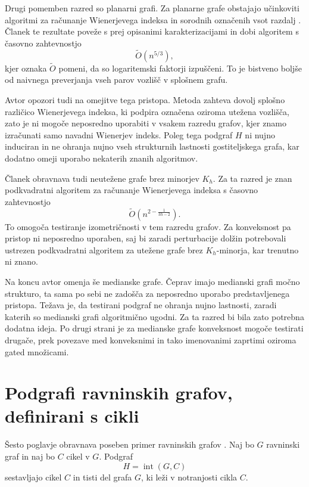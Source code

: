 \documentclass[sigconf
]{acmart}
\theoremstyle{definition}
\begin{document}
Drugi pomemben razred so planarni grafi. Za planarne grafe obstajajo učinkoviti algoritmi za računanje Wienerjevega indeksa in sorodnih označenih vsot razdalj \cite{voronoi, subquadratic}. Članek te rezultate poveže s prej opisanimi karakterizacijami in dobi algoritem s časovno zahtevnostjo
\begin{equation}
    \tilde{O}(n^{5/3}),
\end{equation}
kjer oznaka $\tilde{O}$ pomeni, da so logaritemski faktorji izpuščeni. To je bistveno boljše od naivnega preverjanja vseh parov vozlišč v splošnem grafu.

Avtor opozori tudi na omejitve tega pristopa. Metoda zahteva dovolj splošno različico Wienerjevega indeksa, ki podpira označena oziroma utežena vozlišča, zato je ni mogoče neposredno uporabiti v vsakem razredu grafov, kjer znamo izračunati samo navadni Wienerjev indeks. Poleg tega podgraf $H$ ni nujno induciran in ne ohranja nujno vseh strukturnih lastnosti gostiteljskega grafa, kar dodatno omeji uporabo nekaterih znanih algoritmov.

Članek obravnava tudi neutežene grafe brez minorjev $K_h$. Za ta razred je znan podkvadratni algoritem za računanje Wienerjevega indeksa s časovno zahtevnostjo
\begin{equation}
    \tilde{O}\!\left(n^{2-\frac{1}{3h-2}}\right).
\end{equation}
To omogoča testiranje izometričnosti v tem razredu grafov. Za konveksnost pa pristop ni neposredno uporaben, saj bi zaradi perturbacije dolžin potrebovali ustrezen podkvadratni algoritem za utežene grafe brez $K_h$-minorja, kar trenutno ni znano.

Na koncu avtor omenja še medianske grafe. Čeprav imajo medianski grafi močno strukturo, ta sama po sebi ne zadošča za neposredno uporabo predstavljenega pristopa. Težava je, da testirani podgraf ne ohranja nujno lastnosti, zaradi katerih so medianski grafi algoritmično ugodni. Za ta razred bi bila zato potrebna dodatna ideja. Po drugi strani je za medianske grafe konveksnost mogoče testirati drugače, prek povezave med konveksnimi in tako imenovanimi zaprtimi oziroma gated množicami.

\section{Podgrafi ravninskih grafov, definirani s cikli}
\label{sec:ravninski-cikli}

Šesto poglavje obravnava poseben primer ravninskih grafov \cite{main_paper}. Naj bo $G$ ravninski graf in naj bo $C$ cikel v $G$. Podgraf
\begin{equation}
    H = \operatorname{int}(G, C)
\end{equation}
sestavljajo cikel $C$ in tisti del grafa $G$, ki leži v notranjosti cikla $C$.
\end{document}
